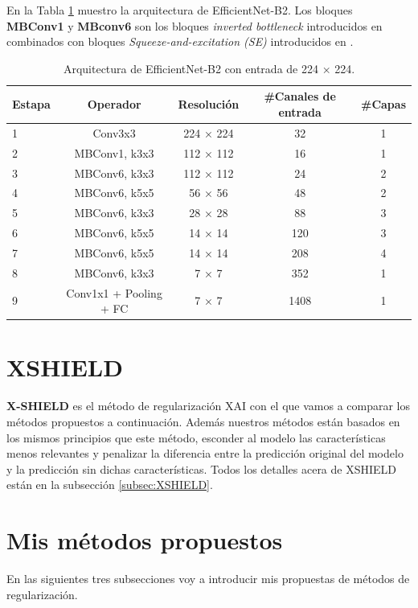 En la Tabla \ref{tab:EfficientNetB2_arquitectura} muestro la arquitectura de EfficientNet-B2. Los bloques \textbf{MBConv1} y \textbf{MBconv6} son los bloques \textit{inverted bottleneck} introducidos en \cite{mobilenet} combinados con bloques \textit{Squeeze-and-excitation (SE)} introducidos en \cite{SE}.

\begin{table}[h!]
\centering
\begin{tabular}{lcccc}
\hline
\textbf{Estapa} & \textbf{Operador} & \textbf{Resolución} & \textbf{\#Canales de entrada} & \textbf{\#Capas} \\
\hline
1 & Conv3x3                & 224 × 224 & 32   & 1 \\
2 & MBConv1, k3x3          & 112 × 112 & 16   & 1 \\
3 & MBConv6, k3x3          & 112 × 112 & 24   & 2 \\
4 & MBConv6, k5x5          & 56 × 56   & 48   & 2 \\
5 & MBConv6, k3x3          & 28 × 28   & 88   & 3 \\
6 & MBConv6, k5x5          & 14 × 14   & 120  & 3 \\
7 & MBConv6, k5x5          & 14 × 14   & 208  & 4 \\
8 & MBConv6, k3x3          & 7 × 7     & 352  & 1 \\
9 & Conv1x1 + Pooling + FC & 7 × 7     & 1408 & 1 \\
\hline
\end{tabular}
\caption{Arquitectura de EfficientNet-B2 con entrada de 224 × 224.}
\label{tab:EfficientNetB2_arquitectura}
\end{table}

\section{XSHIELD}

\textbf{X-SHIELD} \cite{XSHIELD} es el método de regularización XAI con el que vamos a comparar los métodos propuestos a continuación. Además nuestros métodos están basados en los mismos principios que este método, esconder al modelo las características menos relevantes y penalizar la diferencia entre la predicción original del modelo y la predicción sin dichas características. Todos los detalles acera de XSHIELD están en la subsección \ref{subsec:XSHIELD}.



\section{Mis métodos propuestos}
En las siguientes tres subsecciones voy a introducir mis propuestas de métodos de regularización.


